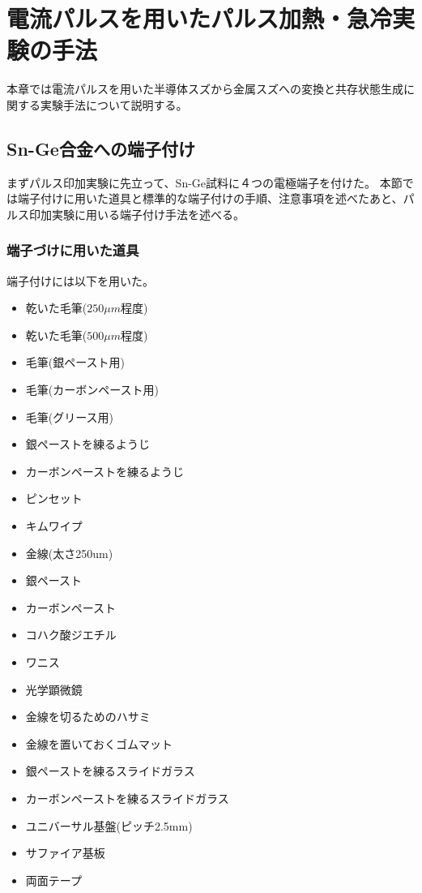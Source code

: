 \section{電流パルスを用いたパルス加熱・急冷実験の手法}
本章では電流パルスを用いた半導体スズから金属スズへの変換と共存状態生成に関する実験手法について説明する。

\subsection{Sn-Ge合金への端子付け}
まずパルス印加実験に先立って、Sn-Ge試料に４つの電極端子を付けた。
本節では端子付けに用いた道具と標準的な端子付けの手順、注意事項を述べたあと、パルス印加実験に用いる端子付け手法を述べる。

\subsubsection{端子づけに用いた道具}
端子付けには以下を用いた。
\begin{itemize}
\item 乾いた毛筆($250\mu m$程度)
\item 乾いた毛筆($500\mu m$程度)
\item 毛筆(銀ペースト用)
\item 毛筆(カーボンペースト用)
\item 毛筆(グリース用)
\item 銀ペーストを練るようじ
\item カーボンペーストを練るようじ
\item ピンセット
\item キムワイプ
\item 金線(太さ250um)
\item 銀ペースト
\item カーボンペースト
\item コハク酸ジエチル
\item ワニス
\item 光学顕微鏡
\item 金線を切るためのハサミ
\item 金線を置いておくゴムマット
\item 銀ペーストを練るスライドガラス
\item カーボンペーストを練るスライドガラス
\item ユニバーサル基盤(ピッチ2.5mm)
\item サファイア基板
\item 両面テープ
\end{itemize}

